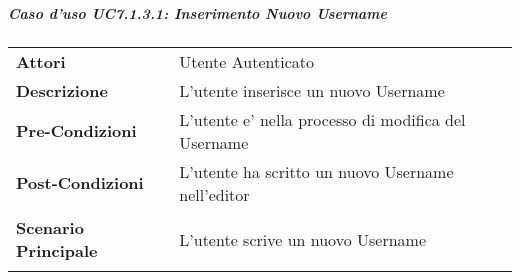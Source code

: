\subparagraph{Caso d'uso UC7.1.3.1:  Inserimento Nuovo Username}
\label{UC7_1_3_1}

\begin{tabular}{ l | p{11cm}}
	\hline
	\rowcolor{Gray}
	 \multicolumn{2}{c}{UC7.1.3.1:  Inserimento Nuovo Username} \\
	 \hline
	\textbf{Attori} & Utente Autenticato \\
	\textbf{Descrizione} & L'utente inserisce un nuovo Username\\
	\textbf{Pre-Condizioni} & L'utente e' nella processo di modifica del Username\\
	\textbf{Post-Condizioni} & L'utente ha scritto un nuovo Username nell'editor\\
	\textbf{Scenario Principale} & 
	\begin{enumerate*}[label=(\arabic*.),itemjoin={\newline}]
		\item L'utente scrive un nuovo Username
	\end{enumerate*}\\
\end{tabular}